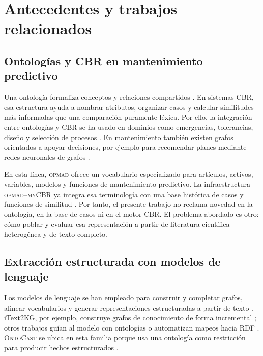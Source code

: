 \documentclass[11pt,a4paper]{article}
\newcommand{\OPMAD}{\textsc{opmad}}
\newcommand{\OntoCast}{\textsc{OntoCast}}
\newcommand{\myCBR}{\textsc{myCBR}}
\begin{document}
\section{Antecedentes y trabajos relacionados}
\label{sec:related}

\subsection{Ontologías y CBR en mantenimiento predictivo}

Una ontología formaliza conceptos y relaciones compartidos \citep{Gruber1993Ontology,NoyMcGuinness2001Ontology101}. En sistemas CBR, esa estructura ayuda a nombrar atributos, organizar casos y calcular similitudes más informadas que una comparación puramente léxica. Por ello, la integración entre ontologías y CBR se ha usado en dominios como emergencias, tolerancias, diseño y selección de procesos \citep{AmailefLu2013OntologyCBR,Qin2018OntologyCBR,RomeroBejarano2014CBRDesign,Mabkhot2019OntologyCBR}. En mantenimiento también existen grafos orientados a apoyar decisiones, por ejemplo para recomendar planes mediante redes neuronales de grafos \citep{Xia2023MaintenanceKG}.

En esta línea, \OPMAD{} ofrece un vocabulario especializado para artículos, activos, variables, modelos y funciones de mantenimiento predictivo. La infraestructura \OPMAD{}--\myCBR{} ya integra esa terminología con una base histórica de casos y funciones de similitud \citep{MonteroJimenez2021OPMADCBR,MunozHernandez2021OntologyCBR}. Por tanto, el presente trabajo no reclama novedad en la ontología, en la base de casos ni en el motor CBR. El problema abordado es otro: cómo poblar y evaluar esa representación a partir de literatura científica heterogénea y de texto completo.

\subsection{Extracción estructurada con modelos de lenguaje}

Los modelos de lenguaje se han empleado para construir y completar grafos, alinear vocabularios y generar representaciones estructuradas a partir de texto \citep{Pan2024LLMKG}. iText2KG, por ejemplo, construye grafos de conocimiento de forma incremental \citep{Lairgi2024IText2KG}; otros trabajos guían al modelo con ontologías o automatizan mapeos hacia RDF \citep{Mustafa2025OntologyGuided,Marketakis2026RDFMappings}. \OntoCast{} se ubica en esta familia porque usa una ontología como restricción para producir hechos estructurados \citep{Belikov2025OntoCast}.
\end{document}
